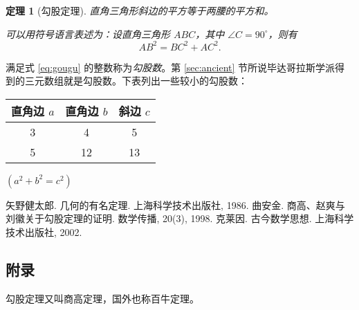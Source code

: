 \documentclass[UTF8]{ctexart}
\newtheorem{thm}{定理}
\begin{document}
\begin{thm}[勾股定理] 

直角三角形斜边的平方等于两腰的平方和。
\par 可以用符号语言表述为：设直角三角形 $ABC$，其中 $\angle C = 90^\circ$，则有
\begin{equation} %
\label{eq:gougu}
AB^2 = BC^2 + AC^2.
\end{equation}
\end{thm}

满足式 \eqref{eq:gougu} 的整数称为\emph{勾股数}。第 \ref{sec:ancient} 节所说毕达哥拉斯学派得到的三元数组就是勾股数。下表列出一些较小的勾股数：
\vspace{3mm}

\begin{tabular}{|c|c|c|} \hline
直角边 $a$ & 直角边 $b$ & 斜边 $c$ \\ \hline
3 & 4 & 5 \\ \hline
5 & 12 & 13 \\ \hline
\end{tabular}

$(a^2 + b^2 = c^2)$ %

\begin{thebibliography}{99}
 矢野健太郎. 几何的有名定理. 上海科学技术出版社, 1986.
 曲安金. 商高、赵爽与刘徽关于勾股定理的证明. 数学传播, 20(3), 1998.
 克莱因. 古今数学思想. 上海科学技术出版社, 2002.
\end{thebibliography}


\begin{appendix}
\section{附录}
勾股定理又叫商高定理，国外也称百牛定理。
\end{appendix}
\end{document}
